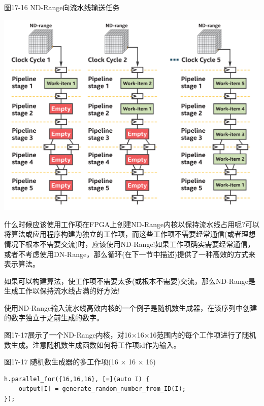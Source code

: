 \hspace*{\fill} \par %
图17-16 ND-Range向流水线输送任务
\begin{center}
	\includegraphics[width=1.0\textwidth]{content/chapter-17/images/15}
\end{center}

什么时候应该使用工作项在FPGA上创建ND-Range内核以保持流水线占用呢?可以将算法或应用程序构建为独立的工作项，而这些工作项不需要经常通信(或者理想情况下根本不需要交流)时，应该使用ND-Range!如果工作项确实需要经常通信，或者不考虑使用DN-Range，那么循环(在下一节中描述)提供了一种高效的方式来表示算法。\par

\begin{tcolorbox}[colback=red!5!white,colframe=red!75!black]
如果可以构建算法，使工作项不需要太多(或根本不需要)交流，那么ND-Range是生成工作以保持流水线占满的好方法!
\end{tcolorbox}

使用ND-Range输入流水线高效内核的一个例子是随机数生成器，在该序列中创建的数字独立于之前生成的数字。\par

图17-17展示了一个ND-Range内核，对16×16×16范围内的每个工作项进行了随机数生成。注意随机数生成函数如何将工作项id作为输入。\par

\hspace*{\fill} \par %
图17-17 随机数生成器的多工作项(16 × 16 × 16)
\begin{lstlisting}[caption={}]
h.parallel_for({16,16,16}, [=](auto I) {
	output[I] = generate_random_number_from_ID(I);
});
\end{lstlisting}

